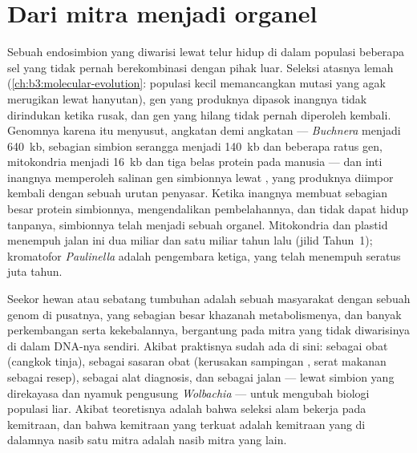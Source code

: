 \section{Dari mitra menjadi organel}

\begin{proposition}\label{prop:b3:microbiomes:reduction}
Sebuah endosimbion yang diwarisi lewat telur hidup di dalam populasi beberapa
sel yang tidak pernah berekombinasi dengan pihak luar. Seleksi atasnya lemah
(\cref{ch:b3:molecular-evolution}: populasi kecil memancangkan mutasi yang agak
merugikan lewat hanyutan), gen yang produknya dipasok inangnya tidak
dirindukan ketika rusak, dan gen yang hilang tidak pernah diperoleh kembali.
Genomnya karena itu menyusut, angkatan demi angkatan --- \emph{Buchnera}
menjadi \qty{640}{kb}, sebagian simbion serangga menjadi \qty{140}{kb} dan
beberapa ratus gen, mitokondria menjadi \qty{16}{kb} dan tiga belas protein
pada manusia --- dan inti inangnya memperoleh salinan gen simbionnya
lewat \emph{}, yang produknya diimpor
kembali dengan sebuah urutan penyasar. Ketika inangnya membuat sebagian besar
protein simbionnya, mengendalikan pembelahannya, dan tidak dapat hidup tanpanya,
simbionnya telah menjadi sebuah organel. Mitokondria dan plastid
menempuh jalan ini dua miliar dan satu miliar tahun lalu
(jilid Tahun~1); kromatofor \emph{Paulinella} adalah pengembara ketiga,
yang telah menempuh seratus juta tahun.
\end{proposition}

\begin{remark}\label{rem:b3:microbiomes:individual}
Seekor hewan atau sebatang tumbuhan adalah sebuah masyarakat dengan sebuah
genom di pusatnya, yang sebagian besar khazanah metabolismenya, dan banyak
perkembangan serta kekebalannya, bergantung pada mitra yang tidak diwarisinya
di dalam DNA-nya sendiri. Akibat praktisnya sudah ada di sini: 
sebagai obat (cangkok tinja), sebagai sasaran obat (kerusakan sampingan
, serat makanan sebagai resep), sebagai alat diagnosis, dan sebagai
jalan --- lewat simbion yang direkayasa dan nyamuk pengusung
\emph{Wolbachia} --- untuk mengubah biologi populasi liar. Akibat
teoretisnya adalah bahwa seleksi alam bekerja pada kemitraan, dan
bahwa kemitraan yang terkuat adalah kemitraan yang di dalamnya nasib satu mitra
adalah nasib mitra yang lain.
\end{remark}


